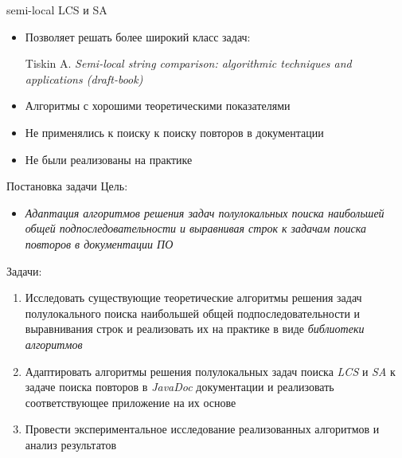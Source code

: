 \documentclass[xcolor=table]{beamer}
\begin{document}
\begin{frame}{semi-local LCS и SA}
    \begin{itemize}
        \vfill\item Позволяет решать более широкий класс задач:\\
        \begin{flushright}
         Tiskin A. \emph{Semi-local string comparison: algorithmic techniques and applications (draft-book)} 
        \end{flushright}
        \vfill\item Алгоритмы с хорошими теоретическими показателями
        \vfill\item Не применялись к поиску к поиску повторов в документации
        \vfill\item Не были реализованы на практике
        
    \end{itemize}

    
\end{frame}


\begin{frame}{Постановка задачи}
    Цель:
    \begin{itemize}
        \vfill \item \emph{Адаптация алгоритмов решения задач полулокальных поиска наибольшей общей подпоследовательности и выравнивая строк к задачам поиска повторов в  документации ПО}
    \end{itemize}
    \vfill Задачи:
    \begin{enumerate}
    \vfill\item  Исследовать существующие теоретические алгоритмы решения задач полулокального поиска наибольшей общей подпоследовательности и выравнивания строк и реализовать их на практике в виде \emph{библиотеки алгоритмов}
    \vfill\item Адаптировать алгоритмы решения полулокальных задач  поиска \emph{LCS} и \emph{SA} к задаче поиска повторов в \emph{JavaDoc} документации и реализовать соответствующее приложение на их основе
    \vfill\item Провести экспериментальное исследование реализованных алгоритмов  и анализ результатов
    \end{enumerate}
\end{frame}
\end{document}
